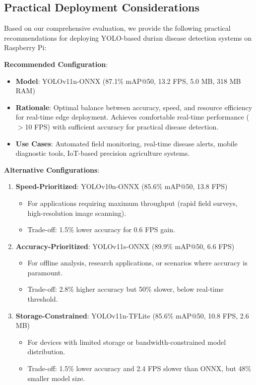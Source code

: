 \subsection{Practical Deployment Considerations}

Based on our comprehensive evaluation, we provide the following practical recommendations for deploying YOLO-based durian disease detection systems on Raspberry Pi:

\textbf{Recommended Configuration}:
\begin{itemize}
\item \textbf{Model}: YOLOv11n-ONNX (87.1\% mAP@50, 13.2 FPS, 5.0 MB, 318 MB RAM)
\item \textbf{Rationale}: Optimal balance between accuracy, speed, and resource efficiency for real-time edge deployment. Achieves comfortable real-time performance ($>$10 FPS) with sufficient accuracy for practical disease detection.
\item \textbf{Use Cases}: Automated field monitoring, real-time disease alerts, mobile diagnostic tools, IoT-based precision agriculture systems.
\end{itemize}

\textbf{Alternative Configurations}:

\begin{enumerate}
\item \textbf{Speed-Prioritized}: YOLOv10n-ONNX (85.6\% mAP@50, 13.8 FPS)
   \begin{itemize}
   \item For applications requiring maximum throughput (rapid field surveys, high-resolution image scanning).
   \item Trade-off: 1.5\% lower accuracy for 0.6 FPS gain.
   \end{itemize}

\item \textbf{Accuracy-Prioritized}: YOLOv11s-ONNX (89.9\% mAP@50, 6.6 FPS)
   \begin{itemize}
   \item For offline analysis, research applications, or scenarios where accuracy is paramount.
   \item Trade-off: 2.8\% higher accuracy but 50\% slower, below real-time threshold.
   \end{itemize}

\item \textbf{Storage-Constrained}: YOLOv11n-TFLite (85.6\% mAP@50, 10.8 FPS, 2.6 MB)
   \begin{itemize}
   \item For devices with limited storage or bandwidth-constrained model distribution.
   \item Trade-off: 1.5\% lower accuracy and 2.4 FPS slower than ONNX, but 48\% smaller model size.
   \end{itemize}
\end{enumerate}

